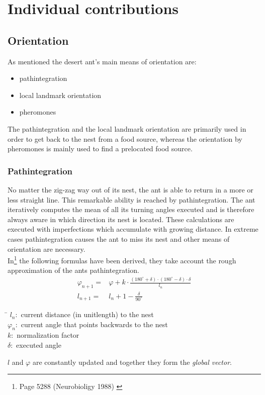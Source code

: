 \documentclass[11pt]{article}
\begin{document}
\newpage
\section{Individual contributions}
\subsection{Orientation}
As mentioned the desert ant's main means of orientation are:
\begin{itemize}
\item pathintegration
\item local landmark orientation
\item pheromones
\end{itemize}
The pathintegration and the local landmark orientation are primarily used in order to get back to the nest from a food source, whereas the orientation by pheromones is mainly used to find a prelocated food source. 

\subsubsection{Pathintegration}
No matter the zig-zag way out of its nest, the ant is able to return in a more or less straight line. This remarkable ability is reached by pathintegration. The ant iteratively computes the mean of all its turning angles executed and is therefore always aware in which direction its nest is located. These calculations are executed with imperfections which accumulate with growing distance. In extreme cases pathintegration causes the ant to miss its nest and other means of orientation are necessary. \\
In\footnote{Page 5288 (Neurobioligy 1988) \cite{xxx}} the following formulas have been derived, they take account the rough approximation of the ants pathintegration. 
\begin{align*}
\varphi_{n+1} =& \varphi +k \cdot \frac{(180^{\circ} + \delta)\cdot(180^{\circ} - \delta)\cdot\delta}{l_{n}} \\
l_{n+1} =& l_{n}+ 1 - \frac{\delta}{90^{\circ}}
\end{align*}
\begin{tabbing}
\hspace{1cm}\=\kill
$l_{n}:$ \> current distance (in unitlength) to the nest \\ 
$\varphi_{n}:$ \> current angle that points backwards to the nest \\ 
$k:$ \>  normalization factor\\ 
$\delta:$ \>  executed angle\\ 
\end{tabbing} 
$l$ and $\varphi$ are constantly updated and together they form the \textit{global vector}.
\end{document}
